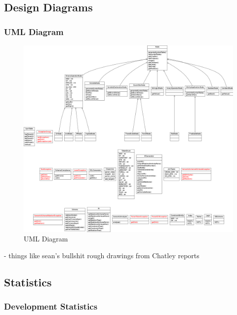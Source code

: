 \documentclass[a4paper, 11pt]{article}
\begin{document}
  \subsection{Design Diagrams}
    \subsubsection{UML Diagram}
    \begin{figure}[H]
        \includegraphics[width=1.0\textwidth]{images/umlisloveley.png}
        \caption{UML Diagram}
      \end{figure}

  - things like sean's bullshit rough drawings from Chatley reports

  \subsection{Statistics}

  \subsubsection{Development Statistics}
\end{document}

